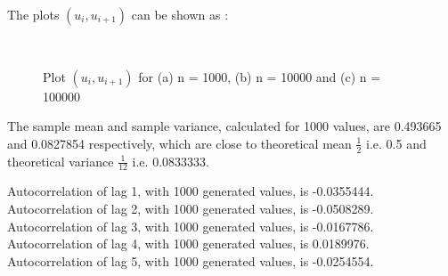 \documentclass[11pt]{article}
\begin{document}
The plots $(u_i , u_{i+1})$ can be shown as :

\begin{figure}[H]
  \centering
  \hspace{10mm}
  \\
    \caption{Plot $(u_i , u_{i+1})$ for (a) n = 1000, (b) n = 10000 and (c) n = 100000}
\end{figure}

The sample mean and sample variance, calculated for 1000 values, are 0.493665 and 0.0827854 respectively, which are close to theoretical mean $\frac{1}{2}$ i.e. 0.5 and theoretical variance $\frac{1}{12}$ i.e. 0.0833333.

Autocorrelation of lag 1, with 1000 generated values, is -0.0355444.\\
Autocorrelation of lag 2, with 1000 generated values, is -0.0508289.\\
Autocorrelation of lag 3, with 1000 generated values, is -0.0167786.\\
Autocorrelation of lag 4, with 1000 generated values, is 0.0189976.\\
Autocorrelation of lag 5, with 1000 generated values, is -0.0254554.
\end{document}
